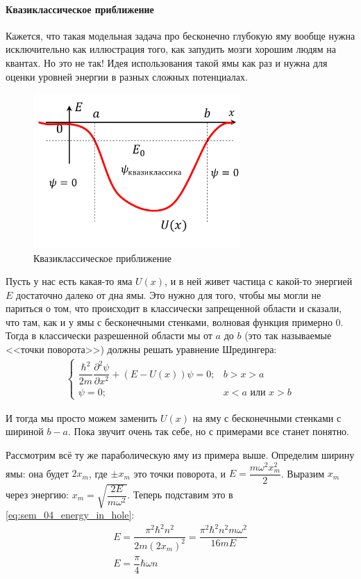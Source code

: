 \documentclass[12pt]{article}
\begin{document}
\paragraph{Квазиклассическое приближение}
Кажется, что такая модельная задача про бесконечно глубокую яму вообще нужна исключительно как иллюстрация того, как запудить мозги хорошим людям на квантах. Но это не так! Идея использования такой ямы как раз и нужна для оценки уровней энергии в разных сложных потенциалах.
\begin{figure}[h]
    \centering
    \includegraphics[width=0.7\textwidth,height=\textheight,keepaspectratio]{Seminar_04/pics/pic_04.pdf}
    \caption{Квазиклассическое приближение}
\end{figure}

Пусть у нас есть какая-то яма $U(x)$, и в ней живет частица с какой-то энергией $E$ достаточно далеко от дна ямы. Это нужно для того, чтобы мы могли не париться о том, что происходит в классически запрещенной области и сказали, что там, как и у ямы с бесконечными стенками, волновая функция примерно 0. Тогда в классически разрешенной области мы от $a$ до $b$ (это так называемые <<точки поворота>>) должны решать уравнение Шредингера:
\begin{gather*}
    \begin{cases}
         \dfrac{\hbar^2}{2m}\dfrac{\partial^2\psi}{\partial x^2} +  (E-U(x))\psi=0; &b>x>a  \\[10pt]
         \psi=0;  &x<a \text{ или } x>b 
    \end{cases}
\end{gather*}

И тогда мы просто можем заменить $U(x)$ на яму с бесконечными стенками с шириной $b-a$. Пока звучит очень так себе, но с примерами все станет понятно.

Рассмотрим всё ту же параболическую яму из примера выше. Определим ширину ямы: она будет $2x_m$, где $\pm x_m$ это точки поворота, и $E = \dfrac{m\omega^2x_m^2}{2}$. Выразим $x_m$ через энергию: $x_m=\sqrt{\dfrac{2E}{m\omega^2}}$. Теперь подставим это в \ref{eq:sem_04_energy_in_hole}:
\begin{gather*}
    E = \dfrac{\pi^2\hbar^2n^2}{2m(2x_m)^2 } = \dfrac{\pi^2\hbar^2n^2 m\omega^2}{16mE  } \\
    E = \dfrac{\pi}{4}\hbar\omega n
\end{gather*}
\end{document}
